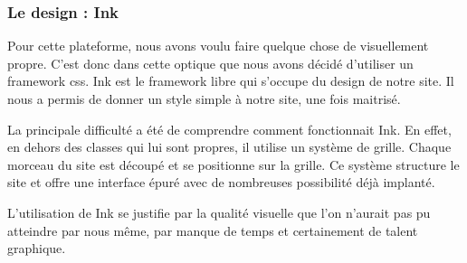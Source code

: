	\subsubsection{Le design : Ink}
	\par
	Pour cette plateforme, nous avons voulu faire quelque chose de visuellement propre. C'est donc dans cette optique que nous avons décidé d'utiliser un framework css. Ink est le framework libre qui s'occupe du design de notre site. Il nous a permis de donner un style simple à notre site, une fois maitrisé.
	\par
	La principale difficulté a été de comprendre comment fonctionnait Ink. En effet, en dehors des classes qui lui sont propres, il utilise un système de grille. Chaque morceau du site est découpé et se positionne sur la grille. Ce système structure le site et offre une interface épuré avec de nombreuses possibilité déjà implanté.
	\par
	L'utilisation de Ink se justifie par la qualité visuelle que l'on n'aurait pas pu atteindre par nous même, par manque de temps et certainement de talent graphique.
